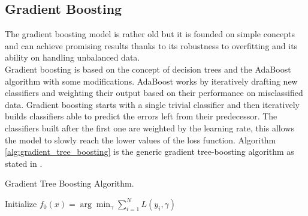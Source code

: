 \documentclass[../../Thesis.tex]{subfiles}
\begin{document}
	 	\subsection{Gradient Boosting}
	 		The gradient boosting model is rather old but it is founded on simple concepts and can achieve promising results thanks to its robustness to overfitting and its ability on handling unbalanced data.\\
	 		 Gradient boosting is based on the concept of decision trees and the AdaBoost algorithm with some modifications. AdaBoost works by iteratively drafting new classifiers and weighting their output based on their performance on misclassified data. Gradient boosting starts with a single trivial classifier and then iteratively builds classifiers able to predict the errors left from their predecessor. The classifiers built after the first one are weighted by the learning rate, this allows the model to slowly reach the lower values of the loss function.
	 		 Algorithm \ref{alg:gradient_tree_boosting} is the generic gradient tree-boosting algorithm as stated in \cite{Hastie2009}.
	 		 \begin{algorithm}[H]
	 		 	\caption{Gradient Tree Boosting Algorithm.}
	 		 	\label{alg:gradient_tree_boosting}
			    	\begin{algorithmic}[1]
			    	\STATE Initialize $f_0 (x) = \arg \min_\gamma \sum_{i=1}^N L(y_i, \gamma)$
				    	\ENDFOR
			    		\ENDFOR
			    	\ENDFOR
			    	\end{algorithmic}
			\end{algorithm}
 		
\end{document}
